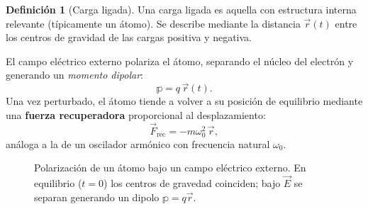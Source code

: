\documentclass[12pt, a4paper]{article}
\theoremstyle{plain}
\theoremstyle{definition}
\newtheorem{definicion}[teorema]{Definición}
\theoremstyle{remark}
\newcommand{\ve}[1]{\vec{#1}}
\begin{document}
\begin{definicion}[Carga ligada]
Una carga ligada es aquella con estructura interna relevante (típicamente un
átomo). Se describe mediante la distancia $\ve{r}(t)$ entre los centros de
gravidad de las cargas positiva y negativa.

El campo eléctrico externo polariza el átomo, separando el núcleo del
electrón y generando un \emph{momento dipolar}:
\begin{equation}
  \mathbb{p} = q\,\ve{r}(t). \label{eq:dipolo}
\end{equation}
Una vez perturbado, el átomo tiende a volver a su posición de equilibrio
mediante una \textbf{fuerza recuperadora} proporcional al desplazamiento:
\begin{equation}
  \ve{F}_\text{rec} = -m\omega_0^2\,\ve{r}, \label{eq:frecup}
\end{equation}
análoga a la de un oscilador armónico con frecuencia natural $\omega_0$.
\end{definicion}

\begin{figure}[H]
  \centering
  \caption{Polarización de un átomo bajo un campo eléctrico externo.
           En equilibrio ($t=0$) los centros de gravedad coinciden; bajo
           $\ve{E}$ se separan generando un dipolo $\mathbb{p}=q\ve{r}$.}
  \label{fig:dipolo}
\end{figure}
\end{document}

